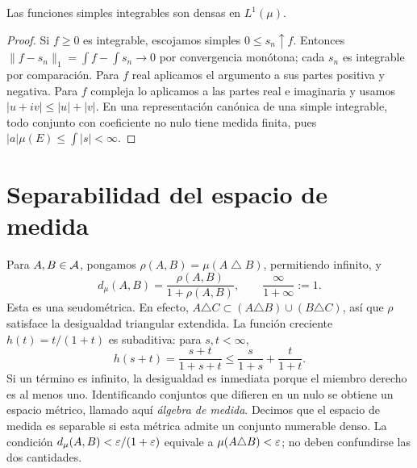 \begin{proposicion}\label{prop:v2-simples-densas}
Las funciones simples integrables son densas en $L^1(\mu)$.
\end{proposicion}
\begin{proof}
Si $f\ge0$ es integrable, escojamos simples $0\le s_n\uparrow f$. Entonces $\|f-s_n\|_1=\int f-\int s_n\to0$ por convergencia monótona; cada $s_n$ es integrable por comparación. Para $f$ real aplicamos el argumento a sus partes positiva y negativa. Para $f$ compleja lo aplicamos a las partes real e imaginaria y usamos $|u+iv|\le|u|+|v|$. En una representación canónica de una simple integrable, todo conjunto con coeficiente no nulo tiene medida finita, pues $|a|\mu(E)\le\int|s|<\infty$.
\end{proof}

\section{Separabilidad del espacio de medida}
Para $A,B\in\mathcal A$, pongamos $\rho(A,B)=\mu(A\mathbin\triangle B)$, permitiendo infinito, y
\[d_\mu(A,B)=\frac{\rho(A,B)}{1+\rho(A,B)},\qquad \frac{\infty}{1+\infty}:=1.
\]
Esta es una seudométrica. En efecto, $A\triangle C\subset(A\triangle B)\cup(B\triangle C)$, así que $\rho$ satisface la desigualdad triangular extendida. La función creciente $h(t)=t/(1+t)$ es subaditiva: para $s,t<\infty$,
\[h(s+t)=\frac{s+t}{1+s+t}\le\frac{s}{1+s}+\frac{t}{1+t}.
\]
Si un término es infinito, la desigualdad es inmediata porque el miembro derecho es al menos uno. Identificando conjuntos que difieren en un nulo se obtiene un espacio métrico, llamado aquí \emph{álgebra de medida}. Decimos que el espacio de medida es separable si esta métrica admite un conjunto numerable denso. La condición $d_\mu(A,B)<\varepsilon/(1+\varepsilon)$ equivale a $\mu(A\triangle B)<\varepsilon$; no deben confundirse las dos cantidades.


